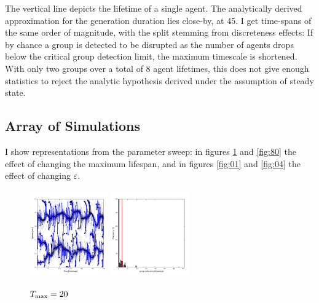 \documentclass[useAMS,usenatbib]{mn2e}
\begin{document}
The vertical line depicts the lifetime of a single agent. The
analytically derived approximation for the generation duration lies
close-by, at 45. I get time-spans of the same order of
magnitude, with the split stemming from discreteness effects: If by
chance a group is detected to be disrupted as the number of agents
drops below the critical group detection limit, the maximum timescale 
is shortened. With only two groups over a total of 8 agent
lifetimes, this does not give enough statistics to reject the analytic
hypothesis derived under the assumption of steady state.


\subsection{Array of  Simulations}

I show representations from the parameter sweep: in figures
\ref{fig:20} and \ref{fig:80} the effect of changing the maximum
lifespan, and in figures \ref{fig:01} and \ref{fig:04} the effect of
changing $\varepsilon$.

\begin{figure}
  \begin{center}
    \includegraphics[width=0.3\textwidth]{fig/evol_20.pdf}
    \includegraphics[width=0.3\textwidth]{fig/var_20.pdf}
  \end{center}
  \caption{\label{fig:20}$T_{\rm max}=20$}
\end{figure}
\end{document}
